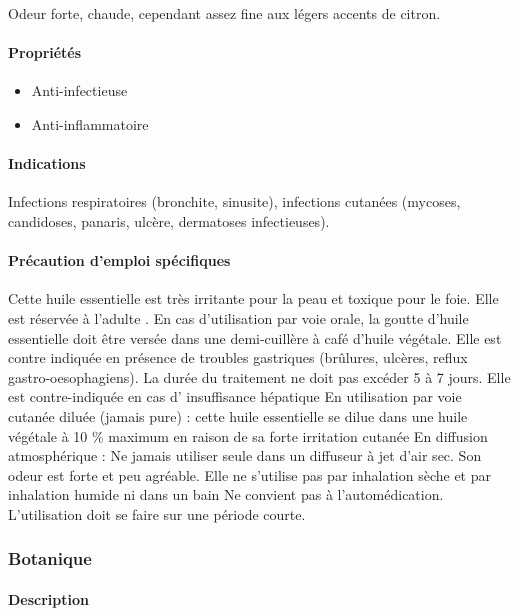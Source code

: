 \documentclass[12pt,a4wide]{article}
\begin{document}
Odeur forte, chaude, cependant assez fine aux légers accents de citron.

\paragraph{Propriétés}
\label{sec-4-10-1-2}
\begin{itemize}
\item Anti-infectieuse
\item Anti-inflammatoire
\end{itemize}

\paragraph{Indications}
\label{sec-4-10-1-3}
Infections respiratoires (bronchite, sinusite), infections cutanées (mycoses, candidoses, panaris, ulcère, dermatoses infectieuses).

\paragraph{Précaution d'emploi spécifiques}
\label{sec-4-10-1-4}

Cette huile essentielle est très irritante pour la peau et toxique pour le foie. Elle est réservée à l'adulte .
En cas d'utilisation par voie orale, la goutte d'huile essentielle doit être versée dans une demi-cuillère à café d'huile végétale. Elle est contre indiquée en présence de troubles gastriques (brûlures, ulcères, reflux gastro-oesophagiens). La durée du traitement ne doit pas excéder 5 à 7 jours. Elle est contre-indiquée en cas d' insuffisance hépatique
En utilisation par voie cutanée diluée (jamais pure) : cette huile essentielle se dilue dans une huile végétale à 10 \% maximum en raison de sa forte irritation cutanée
En diffusion atmosphérique : Ne jamais utiliser seule dans un diffuseur à jet d'air sec. Son odeur est forte et peu agréable.
Elle ne s'utilise pas par inhalation sèche et par inhalation humide ni dans un bain
Ne convient pas à l'automédication. L'utilisation doit se faire sur une période courte.

\subsubsection{Botanique}
\label{sec-4-10-2}

\paragraph{Description}
\label{sec-4-10-2-1}
\end{document}
